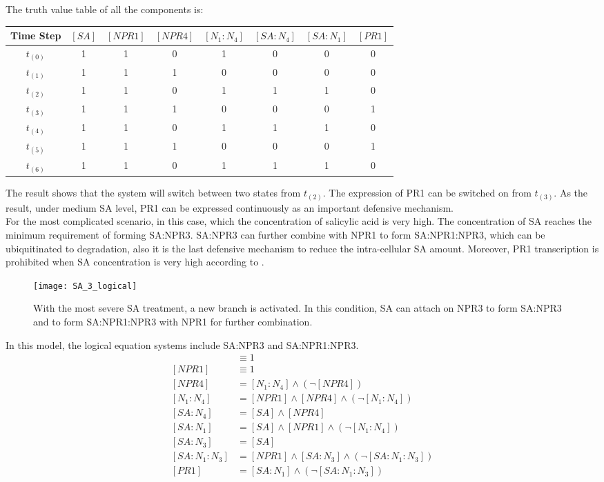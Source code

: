 The truth value table of all the components is: \\
\begin{tabular}{c c c c c c c c}
	\hline
	\footnotesize\textbf{\textsf{Time Step}} & \footnotesize$[SA]$ & \footnotesize$[NPR1]$ & \footnotesize$[NPR4]$ & \footnotesize$[N_1:N_4]$ & \footnotesize$[SA:N_4]$ & \footnotesize$[SA:N_1]$ & \footnotesize$[PR1]$ \\
	\hline
	$t_{(0)}$ & 1 & 1 & 0 & 1 & 0 & 0 & 0 \\
	$t_{(1)}$ & 1 & 1 & 1 & 0 & 0 & 0 & 0 \\
	$t_{(2)}$ & 1 & 1 & 0 & 1 & 1 & 1 & 0 \\
	$t_{(3)}$ & 1 & 1 & 1 & 0 & 0 & 0 & 1 \\
	$t_{(4)}$ & 1 & 1 & 0 & 1 & 1 & 1 & 0 \\
	$t_{(5)}$ & 1 & 1 & 1 & 0 & 0 & 0 & 1 \\
	$t_{(6)}$ & 1 & 1 & 0 & 1 & 1 & 1 & 0 \\
	\hline
\end{tabular}
\linebreak
The result shows that the system will switch between two states from $t_{(2)}$. The expression of PR1 can be switched on from $t_{(3)}$. As the result, under medium SA level, PR1 can be expressed continuously as an important defensive mechanism. \\
For the most complicated scenario, in this case, which the concentration of salicylic acid is very high. The concentration of SA reaches the minimum requirement of forming SA:NPR3. SA:NPR3 can further combine with NPR1 to form SA:NPR1:NPR3, which can be ubiquitinated to degradation, also it is the last defensive mechanism to reduce the intra-cellular SA amount. Moreover, PR1 transcription is prohibited when SA concentration is very high according to . \\
\begin{figure}[H]
	\centering
	\texttt{[image: SA\_3\_logical]}
	\caption{With the most severe SA treatment, a new branch is activated. In this condition, SA can attach on NPR3 to form SA:NPR3 and to form SA:NPR1:NPR3 with NPR1 for further combination. }
\end{figure}
In this model, the logical equation systems include SA:NPR3 and SA:NPR1:NPR3. \\
\begin{align*}
[SA] &\equiv 1 \\
[NPR1] &\equiv 1 \\
[NPR4] &= [N_1:N_4] \wedge (\neg [NPR4]) \\
[N_1:N_4] &= [NPR1] \wedge[NPR4] \wedge (\neg [N_1:N_4]) \\
[SA:N_4] &= [SA] \wedge [NPR4] \\
[SA:N_1] &= [SA] \wedge [NPR1] \wedge (\neg [N_1:N_4]) \\
[SA:N_3] &= [SA] \\
[SA:N_1:N_3] &= [NPR1] \wedge [SA:N_3] \wedge (\neg [SA:N_1:N_3]) \\
[PR1] &= [SA:N_1] \wedge (\neg [SA:N_1:N_3])
\end{align*}
